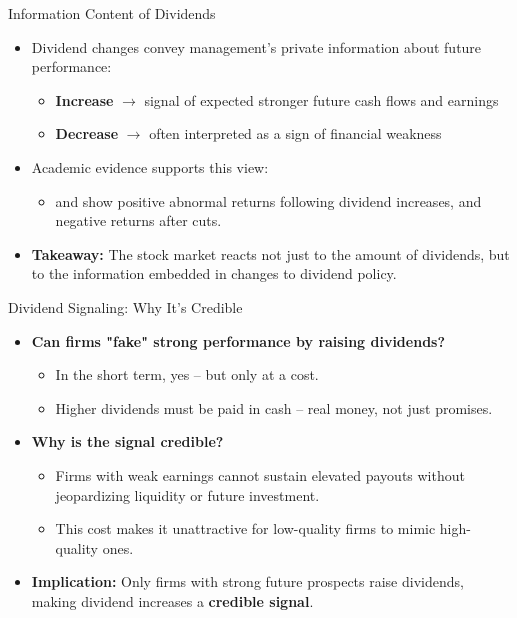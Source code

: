 \begin{frame}{Information Content of Dividends}
\footnotesize
\begin{itemize}
    \item Dividend changes convey management's private information about future performance:
    \begin{itemize}
        \item \textbf{Increase} $\rightarrow$ signal of expected stronger future cash flows and earnings
        \item \textbf{Decrease} $\rightarrow$ often interpreted as a sign of financial weakness
    \end{itemize}

    \vspace{2mm}
    \item Academic evidence supports this view:
    \begin{itemize}
        \item \textcite{asquith1983impact} and \textcite{michaely1995price} show positive abnormal returns following dividend increases, and negative returns after cuts.
    \end{itemize}

    \item \textbf{Takeaway:} The stock market reacts not just to the amount of dividends, but to the information embedded in changes to dividend policy.
\end{itemize}
\end{frame}

\begin{frame}{Dividend Signaling: Why It's Credible}
\footnotesize
\begin{itemize}
    \item \textbf{Can firms "fake" strong performance by raising dividends?}
    \begin{itemize}
        \item In the short term, yes -- but only at a cost.
        \item Higher dividends must be paid in cash -- real money, not just promises.
    \end{itemize}

    \vspace{2mm}
    \item \textbf{Why is the signal credible?}
    \begin{itemize}
        \item Firms with weak earnings cannot sustain elevated payouts without jeopardizing liquidity or future investment.
        \item This cost makes it unattractive for low-quality firms to mimic high-quality ones.
    \end{itemize}

    \vspace{2mm}
    \item \textbf{Implication:} Only firms with strong future prospects raise dividends, making dividend increases a \textbf{credible signal}.
\end{itemize}
\end{frame}

